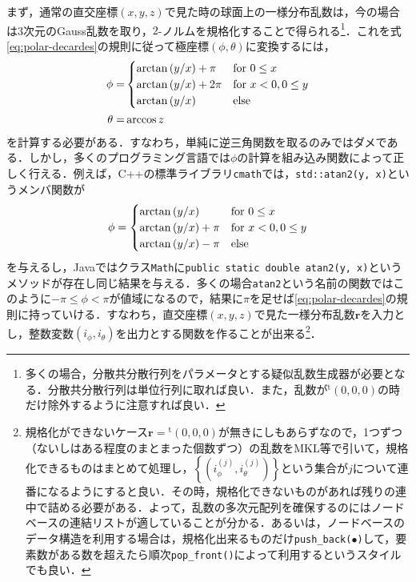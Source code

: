 \documentclass[a4,10pt, platex, dvipdfmx]{jsarticle}
\begin{document}
    まず，通常の直交座標$(x, y, z)$で見た時の球面上の一様分布乱数は，今の場合は3次元のGauss乱数を取り，$2$-ノルムを規格化することで得られる\footnote{多くの場合，分散共分散行列をパラメータとする疑似乱数生成器が必要となる．分散共分散行列は単位行列に取れば良い．また，乱数が${}^{\mathrm{t}} (0, 0, 0) $の時だけ除外するように注意すれば良い．}．これを式\eqref{eq:polar-decardes}の規則に従って極座標$\left(\phi, \theta\right)$に変換するには，
    \begin{align}
        \phi = &
        \begin{cases}
            \arctan \left( y / x \right) + \pi & \text{for $ 0 \leq x $}\\
            \arctan \left( y / x \right) + 2\pi & \text{for $ x < 0, 0 \leq y $}\\
            \arctan \left( y / x \right) & \text{else}
        \end{cases}\\
        \theta = & \arccos z
    \end{align}
    を計算する必要がある．すなわち，単純に逆三角関数を取るのみではダメである．しかし，多くのプログラミング言語では$\phi$の計算を組み込み関数によって正しく行える．例えば，C++の標準ライブラリ\texttt{cmath}では，\texttt{std::atan2(y, x)}というメンバ関数が
    \begin{align}
        \phi = 
        \begin{cases}
            \arctan \left( y / x \right)  & \text{for $ 0 \leq x $}\\
            \arctan \left( y / x \right) + \pi & \text{for $ x < 0, 0 \leq y $}\\
            \arctan \left( y / x \right) - \pi & \text{else}
        \end{cases}
    \end{align}
    を与えるし，Javaではクラス\texttt{Math}に\texttt{public static double atan2(y, x)}というメソッドが存在し同じ結果を与える．多くの場合\texttt{atan2}という名前の関数ではこのように$-\pi \leq \phi < \pi$が値域になるので，結果に$\pi$を足せば\eqref{eq:polar-decardes}の規則に持っていける．すなわち，直交座標$(x, y, z)$で見た一様分布乱数$\bm{r}$を入力とし，整数変数$\left(i_{\phi}, i_{\theta}\right)$を出力とする関数を作ることが出来る\footnote{規格化ができないケース$ \bm{r} = {}^{\mathrm{t}} (0, 0, 0) $が無きにしもあらずなので，1つずつ（ないしはある程度のまとまった個数ずつ）の乱数をMKL等で引いて，規格化できるものはまとめて処理し，$\left\{\left(i^{(j)}_{\phi}, i^{(j)}_{\theta}\right)\right\}$という集合が$j$について連番になるようにすると良い．その時，規格化できないものがあれば残りの連中で詰める必要がある．よって，乱数の多次元配列を確保するのにはノードベースの連結リストが適していることが分かる．あるいは，ノードベースのデータ構造を利用する場合は，規格化出来るものだけ\texttt{push\_back($\bullet$)}して，要素数がある数を超えたら順次\texttt{pop\_front()}によって利用するというスタイルでも良い．}．
\end{document}
